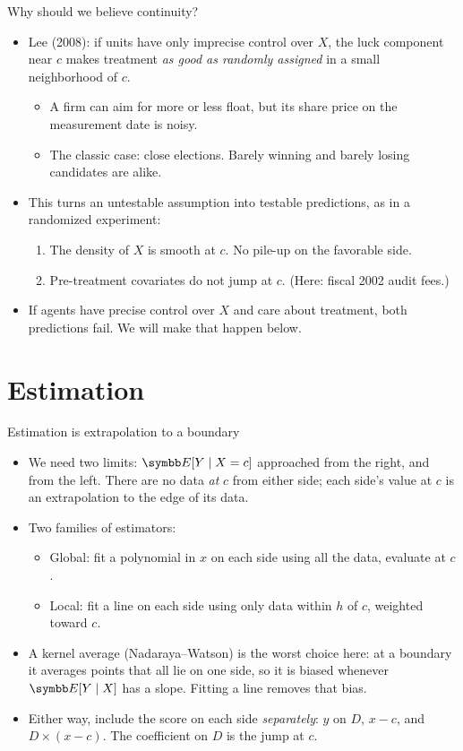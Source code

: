 \documentclass[aspectratio=169,11pt]{beamer}
\begin{document}
\begin{frame}{Why should we believe continuity?}
\begin{itemize}
	\item Lee (2008): if units have only \alert{imprecise control} over $X$, the luck component near $c$ makes
	treatment \emph{as good as randomly assigned} in a small neighborhood of $c$.
	\begin{itemize}
		\item A firm can aim for more or less float, but its share price on the measurement date is noisy.
		\item The classic case: close elections. Barely winning and barely losing candidates are alike.
	\end{itemize}
	\medskip
	\item This turns an untestable assumption into testable predictions, as in a randomized experiment:
	\begin{enumerate}
		\item The \alert{density} of $X$ is smooth at $c$. No pile-up on the favorable side.
		\item \alert{Pre-treatment covariates} do not jump at $c$. (Here: fiscal 2002 audit fees.)
	\end{enumerate}
	\medskip
	\item If agents have \alert{precise} control over $X$ and care about treatment, both predictions fail. We
	will make that happen below.
\end{itemize}
\end{frame}


\section{Estimation}

\begin{frame}{Estimation is extrapolation to a boundary}
\begin{itemize}
	\item We need two limits: $\E[Y \mid X = c]$ approached from the right, and from the left. There are no
	data \emph{at} $c$ from either side; each side's value at $c$ is an extrapolation to the edge of its data.
	\medskip
	\item Two families of estimators:
	\begin{itemize}
		\item \alert{Global}: fit a polynomial in $x$ on each side using all the data, evaluate at $c$.
		\item \alert{Local}: fit a line on each side using only data within $h$ of $c$, weighted toward $c$.
	\end{itemize}
	\medskip
	\item A kernel average (Nadaraya--Watson) is the worst choice here: at a boundary it averages points that
	all lie on one side, so it is biased whenever $\E[Y \mid X]$ has a slope. Fitting a line removes that bias.
	\medskip
	\item Either way, include the score on each side \emph{separately}: $y$ on $D$, $x - c$, and $D \times (x - c)$.
	The coefficient on $D$ is the jump at $c$.
\end{itemize}
\end{frame}
\end{document}
